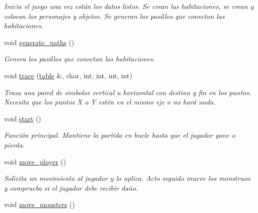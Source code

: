 \begin{DoxyCompactItemize}
\begin{DoxyCompactList}\small\item\em Inicia el juego una vez están los datos listos. Se crean las habitaciones, se crean y colocan los personajes y objetos. Se generan los pasillos que conectan las habitaciones. \end{DoxyCompactList}\item 
\hypertarget{classgame_a72324b08f3e4bbd3792d74b8e63aa282}{void \hyperlink{classgame_a72324b08f3e4bbd3792d74b8e63aa282}{generate\-\_\-paths} ()}\label{classgame_a72324b08f3e4bbd3792d74b8e63aa282}

\begin{DoxyCompactList}\small\item\em Genera los pasillos que conectan las habitaciones. \end{DoxyCompactList}\item 
void \hyperlink{classgame_a5d6c715d5330843ab2d6fc7e5451c5a3}{trace} (\hyperlink{classtable}{table} \&, char, int, int, int, int)
\begin{DoxyCompactList}\small\item\em Traza una pared de simbolos vertical u horizontal con destino y fin en los puntos. Necesita que los puntos X o Y estén en el mismo eje o no hará nada. \end{DoxyCompactList}\item 
\hypertarget{classgame_aedb665cc9bbc7297ab634c5a55bd80d2}{void \hyperlink{classgame_aedb665cc9bbc7297ab634c5a55bd80d2}{start} ()}\label{classgame_aedb665cc9bbc7297ab634c5a55bd80d2}

\begin{DoxyCompactList}\small\item\em Función principal. Mantiene la partida en bucle hasta que el jugador gane o pierda. \end{DoxyCompactList}\item 
\hypertarget{classgame_ab13015cdc535671de1dd7a5a7970a238}{void \hyperlink{classgame_ab13015cdc535671de1dd7a5a7970a238}{move\-\_\-player} ()}\label{classgame_ab13015cdc535671de1dd7a5a7970a238}

\begin{DoxyCompactList}\small\item\em Solicita un movimiento al jugador y lo aplica. Acto seguido mueve los monstruos y comprueba si el jugador debe recibir daño. \end{DoxyCompactList}\item 
\hypertarget{classgame_a4d6a95e11f2e1e94c2068131dc20a243}{void \hyperlink{classgame_a4d6a95e11f2e1e94c2068131dc20a243}{move\-\_\-monsters} ()}\label{classgame_a4d6a95e11f2e1e94c2068131dc20a243}


\end{DoxyCompactItemize}
